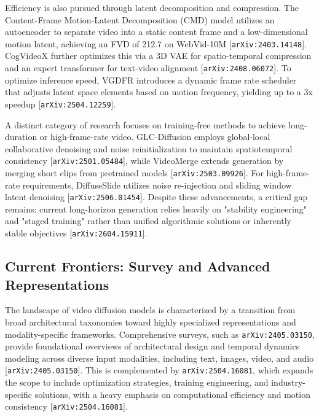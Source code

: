 \documentclass[11pt]{article}
\begin{document}
Efficiency is also pursued through latent decomposition and compression. The Content-Frame Motion-Latent Decomposition (CMD) model utilizes an autoencoder to separate video into a static content frame and a low-dimensional motion latent, achieving an FVD of 212.7 on WebVid-10M [\texttt{arXiv:2403.14148}]. CogVideoX further optimizes this via a 3D VAE for spatio-temporal compression and an expert transformer for text-video alignment [\texttt{arXiv:2408.06072}]. To optimize inference speed, VGDFR introduces a dynamic frame rate scheduler that adjusts latent space elements based on motion frequency, yielding up to a 3x speedup [\texttt{arXiv:2504.12259}].

A distinct category of research focuses on training-free methods to achieve long-duration or high-frame-rate video. GLC-Diffusion employs global-local collaborative denoising and noise reinitialization to maintain spatiotemporal consistency [\texttt{arXiv:2501.05484}], while VideoMerge extends generation by merging short clips from pretrained models [\texttt{arXiv:2503.09926}]. For high-frame-rate requirements, DiffuseSlide utilizes noise re-injection and sliding window latent denoising [\texttt{arXiv:2506.01454}]. Despite these advancements, a critical gap remains: current long-horizon generation relies heavily on "stability engineering" and "staged training" rather than unified algorithmic solutions or inherently stable objectives [\texttt{arXiv:2604.15911}].

\subsection{Current Frontiers: Survey and Advanced Representations}

The landscape of video diffusion models is characterized by a transition from broad architectural taxonomies toward highly specialized representations and modality-specific frameworks. Comprehensive surveys, such as \texttt{arXiv:2405.03150}, provide foundational overviews of architectural design and temporal dynamics modeling across diverse input modalities, including text, images, video, and audio [\texttt{arXiv:2405.03150}]. This is complemented by \texttt{arXiv:2504.16081}, which expands the scope to include optimization strategies, training engineering, and industry-specific solutions, with a heavy emphasis on computational efficiency and motion consistency [\texttt{arXiv:2504.16081}].
\end{document}

